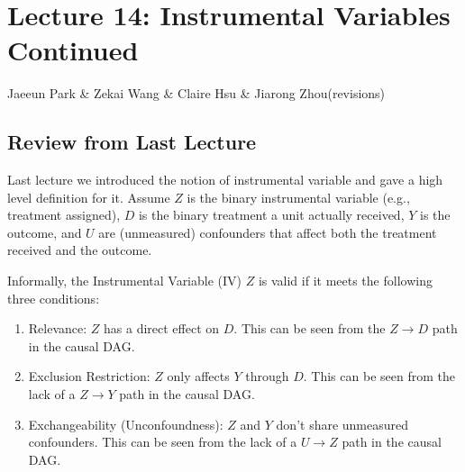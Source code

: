 \section{Lecture 14: Instrumental Variables Continued}{Jaeeun Park \& Zekai Wang \& Claire Hsu \& Jiarong Zhou(revisions)}
\subsection{Review from Last Lecture}
Last lecture we introduced the notion of instrumental variable and gave a high level definition for it. Assume \(Z\) is the binary instrumental variable (e.g., treatment assigned), \(D\) is the binary treatment a unit actually received, \(Y\) is the outcome, and \(U\) are (unmeasured) confounders that affect both the treatment received and the outcome. 
\begin{center}
\end{center}

\begin{definition}
    Informally, the Instrumental Variable (IV) \(Z\) is valid if it meets the following three conditions:
    \begin{enumerate}
        \item Relevance: \(Z\) has a direct effect on \(D\). This can be seen from the \(Z \to D\) path in the causal DAG. 
        \item Exclusion Restriction: \(Z\) only affects \(Y\) through \(D\). This can be seen from the lack of a \(Z \to Y\) path in the causal DAG. 
        \item Exchangeability (Unconfoundness): \(Z\) and \(Y\) don't share unmeasured confounders. This can be seen from the lack of a \(U \to Z\) path in the causal DAG. 
    \end{enumerate}
\end{definition}

